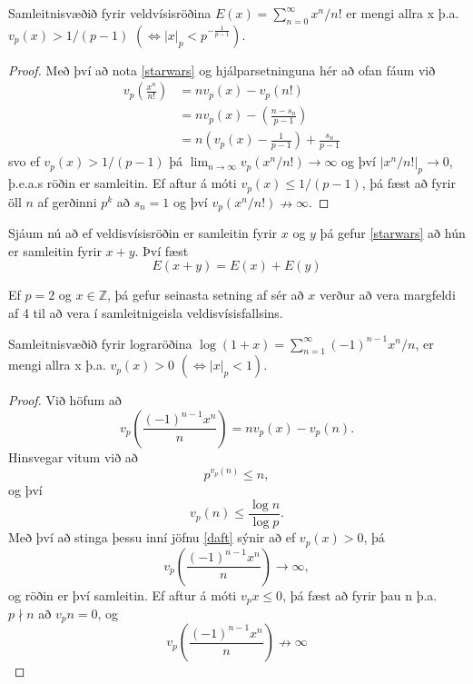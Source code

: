 \begin{setn}
Samleitnisvæðið fyrir veldvísisröðina $E(x) = \sum_{n=0}^{\infty} x^n/n!$ er mengi allra x þ.a.
$v_p(x)>1/(p-1)$  $(\iff |x|_p < p^{- \frac{1}{p-1}} )$.
\end{setn}
\begin{proof}
Með því að nota \ref{starwars} og hjálparsetninguna hér að ofan fáum við
\begin{align*}
v_p \left( \frac{x^n}{n!} \right) & =  n v_p (x) - v_p(n!) & \\
 & =  n v_p (x) - \left( \frac{n - s_n}{p-1} \right) &\\ 
 & =  n \left( v_p (x) - \frac{1}{p-1} \right) + \frac{s_n}{p-1}&
\end{align*}
svo ef $v_p (x) > 1/(p-1)$ þá $\lim_{n\rightarrow \infty } v_p (x^n/n!) \rightarrow \infty$ 
og því $|x^n/n!|_p \rightarrow 0$, þ.e.a.s röðin er samleitin.
Ef aftur á móti $v_p(x) \leq 1/(p-1)$, þá fæst að fyrir öll $n$ af gerðinni $p^k$ að $s_n = 1$ og því $v_p(x^n/n!) \nrightarrow \infty$.
\end{proof}

Sjáum nú að ef veldisvísisröðin er samleitin fyrir $x$ og $y$ þá gefur \ref{starwars} að hún er samleitin fyrir $x+y$. Því fæst
\begin{equation*}
E(x+y) = E(x) + E(y)
\end{equation*}

\begin{daemi}
Ef $p=2$ og $x \in \mathbb{Z}$, þá gefur seinasta setning af sér að $x$ verður að vera margfeldi af 4 til að vera í samleitnigeisla veldisvísisfallsins. 
\end{daemi}

\begin{setn}
Samleitnisvæðið fyrir lograröðina $\log(1+x) = \sum_{n=1}^{\infty} (-1)^{n-1}x^n/n$, er mengi allra x þ.a. $v_p(x)>0$  $(\iff |x|_p<1)$.
\end{setn}
\begin{proof}
Við höfum að 
\begin{equation} \label{daft}
v_p \left( \frac{(-1)^{n-1}x^n}{n} \right) = n v_p(x) - v_p (n).
\end{equation}
Hinsvegar vitum við að 
\begin{equation*}
p^{v_p (n)} \leq n,
\end{equation*}
og því 
\begin{equation*}
v_p (n) \leq \frac{\log n}{\log p}.
\end{equation*}
Með því að stinga þessu inní jöfnu \ref{daft} sýnir að ef $v_p (x)> 0$, þá
\begin{equation*}
v_p \left( \frac{(-1)^{n-1}x^n}{n} \right) \rightarrow \infty,
\end{equation*}
og röðin er því samleitin. Ef aftur á móti $v_p x \leq 0$, þá fæst að fyrir þau n þ.a. $p \nmid n $ að $v_pn=0$, og
\begin{equation*}
v_p \left( \frac{(-1)^{n-1}x^n}{n} \right) \nrightarrow \infty
\end{equation*}
\end{proof}

